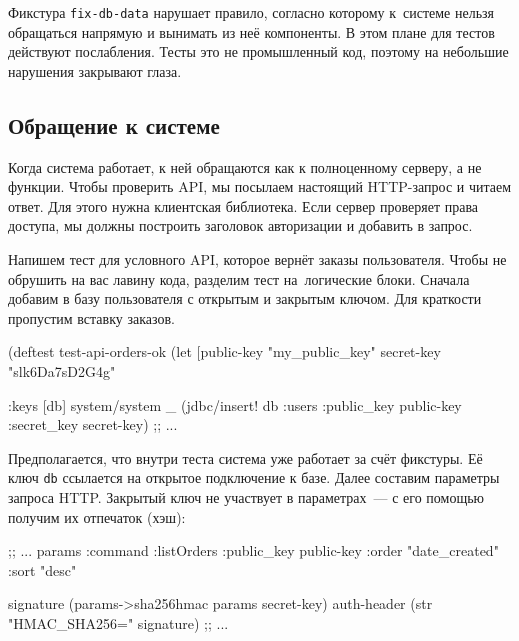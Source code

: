 Фикстура \verb|fix-db-data| нарушает правило, согласно которому к~системе нельзя
обращаться напрямую и вынимать из неё компоненты. В этом плане для тестов
действуют послабления. Тесты это не промышленный код, поэтому на небольшие
нарушения закрывают глаза.

\subsection{Обращение к системе}

Когда система работает, к ней обращаются как к полноценному серверу, а не
функции. Чтобы проверить API, мы посылаем настоящий HTTP-запрос и читаем
ответ. Для этого нужна клиентская библиотека. Если сервер проверяет права
доступа, мы должны построить заголовок авторизации и добавить в запрос.

Напишем тест для условного API, которое вернёт заказы пользователя. Чтобы не
обрушить на вас лавину кода, разделим тест на~логические блоки. Сначала добавим
в базу пользователя с открытым и закрытым ключом. Для краткости пропустим
вставку заказов.

\begin{english}
  \begin{clojure}
(deftest test-api-orders-ok
  (let [public-key "my_public_key"
        secret-key "slk6Da7sD2G4g"

        {:keys [db]} system/system
        _ (jdbc/insert! db :users {:public_key public-key
                                   :secret_key secret-key})
        ;; ...
  \end{clojure}
\end{english}

Предполагается, что внутри теста система уже работает за счёт фикстуры. Её ключ
\verb|db| ссылается на открытое подключение к базе. Далее составим параметры запроса
HTTP. Закрытый ключ не участвует в параметрах~--- с его помощью получим их
отпечаток (хэш):

\begin{english}
  \begin{clojure}
        ;; ...
        params {:command :listOrders
                :public_key public-key
                :order "date_created"
                :sort "desc"}

        signature (params->sha256hmac params secret-key)
        auth-header (str "HMAC_SHA256=" signature)
        ;; ...
  \end{clojure}
\end{english}

